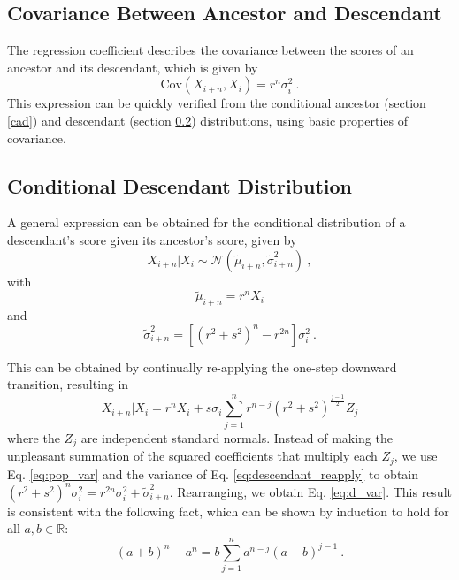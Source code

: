\documentclass{svproc} %
\begin{document}
\subsection{Covariance Between Ancestor and Descendant}
The regression coefficient describes the covariance between the scores of an ancestor and its descendant, which is given by
\begin{equation}
\mathrm{Cov}(X_{i+n}, X_i) = r^n \sigma_i^2 \ .
\label{eq:covariance}
\end{equation}
This expression can be quickly verified from the conditional ancestor (section \ref{cad}) and descendant (section \ref{cdd}) distributions, using basic properties of covariance. 


\subsection{Conditional Descendant Distribution} \label{cdd}

A general expression can be obtained for the conditional distribution of a descendant's score given its ancestor's score, given by
\begin{equation}
X_{i+n}|X_i \sim \mathcal{N}( \tilde{\mu}_{i+n}, \tilde{\sigma}_{i+n}^2) \ ,
\label{eq:d_dist}
\end{equation}
with
\begin{equation}
\tilde{\mu}_{i+n} = r^nX_i
\label{eq:d_mean}
\end{equation}
and
\begin{equation}
\tilde{\sigma}_{i+n}^2 = [(r^2+s^2)^n-r^{2n}] \sigma_i^2 \ .
\label{eq:d_var}
\end{equation}

This can be obtained by continually re-applying the one-step downward transition, resulting in
\begin{equation}
X_{i+n}|X_i = r^nX_i + s\sigma_i \sum_{j=1}^{n}r^{n-j}(r^2+s^2)^{\frac{j-1}{2}}Z_j 
\label{eq:descendant_reapply}
\end{equation}
where the $Z_j$ are independent standard normals. Instead of making the unpleasant summation of the squared coefficients that multiply each $Z_j$, we use Eq. \ref{eq:pop_var} and the variance of Eq. \ref{eq:descendant_reapply} to obtain $(r^2+s^2)^n  \sigma_{i}^2 =  r^{2n}\sigma_i^2 + \tilde{\sigma}_{i+n}^2$. Rearranging, we obtain Eq. \ref{eq:d_var}. This result is consistent with the following fact, which can be shown by induction to hold for all $a, b \in \mathbb{R}$:
\begin{equation}
(a+b)^n - a^n = b \sum_{j=1}^{n}a^{n-j}(a+b)^{j-1} \ .
\label{eq:induction_fact}
\end{equation}
\end{document}
